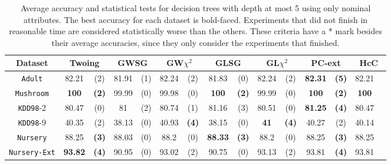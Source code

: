 \begin{table*}[t]
\tiny 
\centering
\caption{Average accuracy and statistical tests  for  decision trees 
with depth at most 5 using only nominal attributes. The best accuracy for each dataset is bold-faced. Experiments that did not finish in reasonable time are considered statistically worse than the others. These criteria have a * mark besides their average accuracies, since they only consider the experiments that finished.}
\begin{tabular}{c|cc|cc|cc|cc|cc|cc|cc} 
Dataset & \multicolumn{2}{c|}{Twoing} &  \multicolumn{2}{c|}{GWSG}  
&   \multicolumn{2}{c|}{GW$\chi^2$}                   &\multicolumn{2}{c|}{GLSG}       &\multicolumn{2}{c|}{GL$\chi^2$} & \multicolumn{2}{c|}{PC-ext} & \multicolumn{2}{c}{HcC}\\  \hline 
{\tt Adult}         & 82.21    & (2)    & 81.91    & (1)    & 82.24    & (2)    & 81.83    & (0)    & 82.24    & (2)    &{\bf82.31}&{\bf(5)}         & 82.21    &    \\
{\tt Mushroom}      & {\bf 100}&{\bf(2)}& 99.99    & (0)    & 99.98    & (0)    &{\bf  100}&{\bf(2)}& 99.99    & (0)    &{\bf 100} &{\bf(2)}         &{\bf100}  &    \\
{\tt KDD98}-2       & 80.47    & (0)    & 81       & (2)    & 80.74    & (1)    & 81.16    & (3)    & 80.51    & (0)    &{\bf81.25}&{\bf(4)}         & 80.47    &    \\
{\tt KDD98}-9       & 40.35    & (2)    & 38.13    & (0)    & 40.93    &{\bf(4)}& 38.15    & (0)    &{\bf 41 } &{\bf(4)}& 40.27    & (2)             & 40.14    &    \\
{\tt Nursery}       & 88.25    &{\bf(3)}& 88.03    & (0)    & 88.2     & (0)    &{\bf88.33}&{\bf(3)}& 88.2     & (0)    & 88.25    &{\bf(3)}         & 88.25    &    \\
{\tt Nursery-Ext}   &{\bf93.82}&{\bf(4)}& 90.95    & (0)    & 93.02    & (2)    & 90.75    & (0)    & 93.13    & (2)    & 93.81    &{\bf(4)}         & 93.81    &    \\

\end{tabular}
\end{table*}
